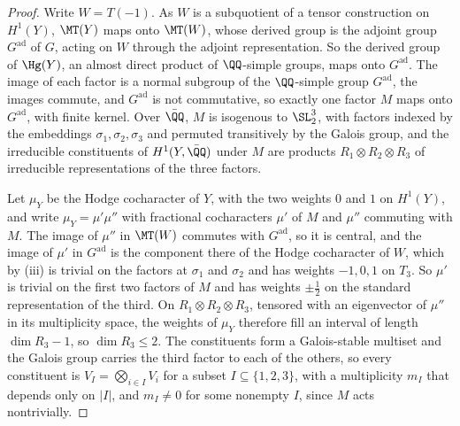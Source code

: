 \begin{proof}
Write $W=T(-1)$. As $W$ is a subquotient of a tensor construction on
$H^{1}(Y)$, $\MT(Y)$ maps onto $\MT(W)$, whose derived group is the adjoint
group $G^{\mathrm{ad}}$ of $G$, acting on $W$ through the adjoint
representation. So the derived group of $\Hg(Y)$, an almost direct product of
$\QQ$-simple groups, maps onto $G^{\mathrm{ad}}$. The image of each factor is
a normal subgroup of the $\QQ$-simple group $G^{\mathrm{ad}}$, the images
commute, and $G^{\mathrm{ad}}$ is not commutative, so exactly one factor $M$
maps onto $G^{\mathrm{ad}}$, with finite kernel. Over $\bar{\QQ}$, $M$ is
isogenous to $\SL_{2}^{3}$, with factors indexed by the embeddings
$\sigma_{1},\sigma_{2},\sigma_{3}$ and permuted transitively by the Galois
group, and the irreducible constituents of $H^{1}(Y,\bar{\QQ})$ under $M$ are
products $R_{1}\otimes R_{2}\otimes R_{3}$ of irreducible representations of
the three factors.

Let $\mu_{Y}$ be the Hodge cocharacter of $Y$, with the two weights $0$ and
$1$ on $H^{1}(Y)$, and write $\mu_{Y}=\mu'\mu''$ with fractional cocharacters
$\mu'$ of $M$ and $\mu''$ commuting with $M$. The image of $\mu''$ in
$\MT(W)$ commutes with $G^{\mathrm{ad}}$, so it is central, and the image of
$\mu'$ in $G^{\mathrm{ad}}$ is the component there of the Hodge cocharacter of
$W$, which by (iii) is trivial on the factors at
$\sigma_{1}$ and $\sigma_{2}$ and has weights $-1,0,1$ on $T_{3}$. So $\mu'$
is trivial on the first two factors of $M$ and has weights $\pm\frac12$ on
the standard representation of the third. On
$R_{1}\otimes R_{2}\otimes R_{3}$, tensored with an eigenvector of $\mu''$
in its multiplicity space, the weights of $\mu_{Y}$ therefore fill an
interval of length $\dim R_{3}-1$, so
$\dim R_{3}\le2$. The constituents form a Galois-stable multiset and the
Galois group carries the third factor to each of the others, so every
constituent is $V_{I}=\bigotimes_{i\in I}V_{i}$ for a subset
$I\subseteq\{1,2,3\}$, with a multiplicity $m_{I}$ that depends only on $|I|$,
and $m_{I}\ne0$ for some nonempty $I$, since $M$ acts nontrivially.


\end{proof}
